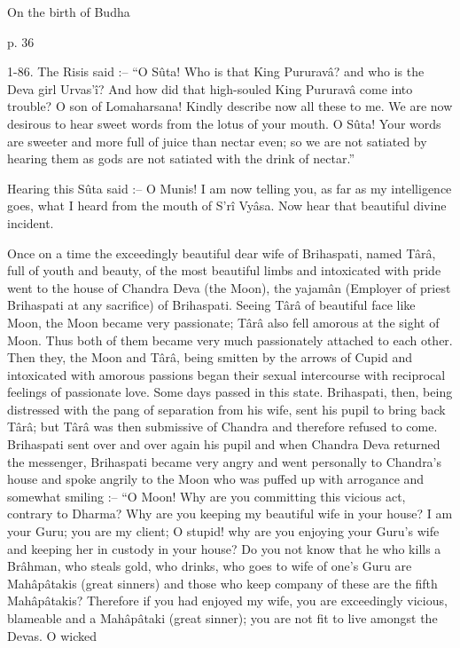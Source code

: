 On the birth of Budha

 

p. 36

 

1-86. The Risis said :-- “O Sûta! Who is that King Pururavâ? and who is the Deva girl Urvas'î? And how did that high-souled King Pururavâ come into trouble? O son of Lomaharsana! Kindly describe now all these to me. We are now desirous to hear sweet words from the lotus of your mouth. O Sûta! Your words are sweeter and more full of juice than nectar even; so we are not satiated by hearing them as gods are not satiated with the drink of nectar.”

 

Hearing this Sûta said :-- O Munis! I am now telling you, as far as my intelligence goes, what I heard from the mouth of S'rî Vyâsa. Now hear that beautiful divine incident.

 

Once on a time the exceedingly beautiful dear wife of Brihaspati, named Târâ, full of youth and beauty, of the most beautiful limbs and intoxicated with pride went to the house of Chandra Deva (the Moon), the yajamân (Employer of priest Brihaspati at any sacrifice) of Brihaspati. Seeing Târâ of beautiful face like Moon, the Moon became very passionate; Târâ also fell amorous at the sight of Moon. Thus both of them became very much passionately attached to each other. Then they, the Moon and Târâ, being smitten by the arrows of Cupid and intoxicated with amorous passions began their sexual intercourse with reciprocal feelings of passionate love. Some days passed in this state. Brihaspati, then, being distressed with the pang of separation from his wife, sent his pupil to bring back Târâ; but Târâ was then submissive of Chandra and therefore refused to come. Brihaspati sent over and over again his pupil and when Chandra Deva returned the messenger, Brihaspati became very angry and went personally to Chandra's house and spoke angrily to the Moon who was puffed up with arrogance and somewhat smiling :-- “O Moon! Why are you committing this vicious act, contrary to Dharma? Why are you keeping my beautiful wife in your house? I am your Guru; you are my client; O stupid! why are you enjoying your Guru's wife and keeping her in custody in your house? Do you not know that he who kills a Brâhman, who steals gold, who drinks, who goes to wife of one's Guru are Mahâpâtakis (great sinners) and those who keep company of these are the fifth Mahâpâtakis? Therefore if you had enjoyed my wife, you are exceedingly vicious, blameable and a Mahâpâtaki (great sinner); you are not fit to live amongst the Devas. O wicked

